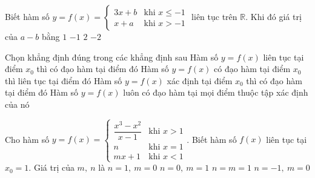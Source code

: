\begin{ex}%
	Biết hàm số $y=f(x)= \begin{cases} 3x+b & \text{khi } x \leqslant -1   \\ x+a & \text{khi } x > -1 \end{cases}$ liên tục trên $ \mathbb{R} $. Khi đó giá trị của $ a-b $ bằng
	\choice
	{$1$}
	{$-1$}
	{$2$}
	{\True $-2$}
	\end{ex}
	
\begin{ex}%
	Chọn khẳng định đúng trong các khẳng định sau
	\choice
	{Hàm số $ y=f(x) $ liên tục tại điểm $ x_0 $ thì có đạo hàm tại điểm đó}
	{\True Hàm số $ y=f(x) $ có đạo hàm tại điểm $ x_0 $ thì liên tục tại điểm đó}
	{Hàm số $ y=f(x) $ xác định tại điểm $ x_0 $ thì có đạo hàm tại điểm đó}
	{Hàm số $ y=f(x) $ luôn có đạo hàm tại mọi điểm thuộc tập xác định của nó}
	\end{ex}
	
\begin{ex}%
Cho hàm số $y=f(x)= \begin{cases} \dfrac{x^3 - x^2}{x - 1} & \text{khi } x > 1 \\ n & \text{khi } x = 1 \\ mx + 1 & \text{khi } x < 1 \end{cases}$. Biết hàm số $ f(x) $ liên tục tại $x_0 = 1$. Giá trị của $ m,\ n $ là
	\choice
	{\True $n = 1,\ m = 0$}
	{$n = 0,\ m = 1$}
	{$n = m = 1$}
	{$n =  - 1,\ m = 0$}
	\end{ex}
	

